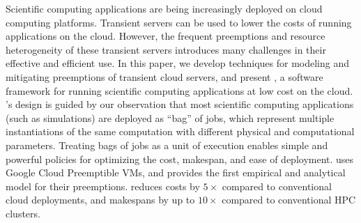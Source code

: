 Scientific computing applications are being increasingly deployed on cloud computing platforms.
%
Transient servers can be used to lower the costs of running applications on the cloud.
%
However, the frequent preemptions and resource heterogeneity of these transient servers introduces many challenges in their effective and efficient use.
%
In this paper, we develop techniques for modeling and mitigating preemptions of transient cloud servers, and present \sysname, a software framework for running scientific computing applications at low cost on the cloud.
%
\sysname's design is guided by our observation that most scientific computing applications (such as simulations) are deployed as ``bag'' of jobs, which represent multiple instantiations of the same computation with different physical and computational parameters.
%
Treating bags of jobs as a unit of execution enables simple and powerful policies for optimizing the cost, makespan, and ease of deployment. 
%
\sysname uses Google Cloud Preemptible VMs, and provides the first empirical and analytical model for their preemptions.
%
\sysname reduces costs by $5\times$ compared to conventional cloud deployments, and makespans by up to $10\times$ compared to conventional HPC clusters.









